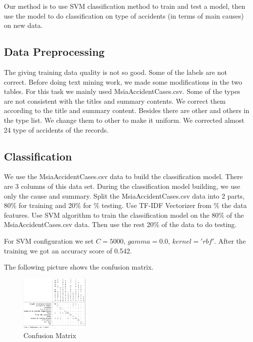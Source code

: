 \documentclass[DIV=calc, paper=a4, fontsize=11pt, twocolumn]{scrartcl}	 %
\begin{document}
Our method is to use SVM classification method to train and test a model, then use the model to do classification on type of accidents (in terms of main causes) on new data.


\subsection{Data Preprocessing}
The giving training data quality is not so good. Some of the labels
are not correct. Before doing text mining work, we made some
modifications in the two tables. For this task we mainly used
MsiaAccidentCases.csv. Some of the types are not consistent with the
titles and summary contents. We correct them according to the title
and summary content. Besides there are other and others in the type
list. We change them to other to make it uniform. We corrected almost 24
type of accidents of the records.

\subsection{Classification}
\label{classification}

We use the MsiaAccidentCases.csv data to build the classification
model. There are 3 columns of this data set. During the classification
model building, we use only the cause and summary. Split the
MsiaAccidentCases.csv data into 2 parts, 80\% for training and 20\% for
                                \% testing. Use TF-IDF Vectorizer from
                                \% the data features.
Use SVM algorithm to train the classification model on the 80\% of the MsiaAccidentCases.csv data. Then use the rest 20\% of the data to do testing.


For SVM configuration we set $C = 5000$, $gamma = 0.0$, $kernel =
'rbf'$. After the training we got an accuracy score of 0.542.

The following picture shows the confusion matrix.

\begin{figure}[h!]
  \centering
      \includegraphics[width=0.3\textwidth]{confusion.png}
  \caption{Confusion Matrix}
\end{figure}
\end{document}
